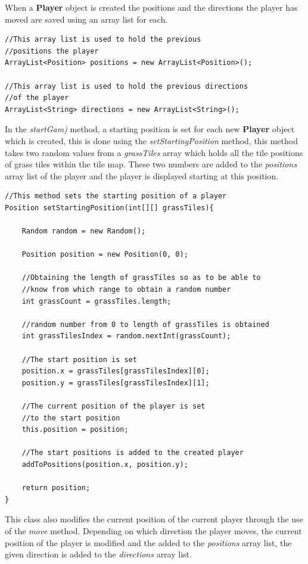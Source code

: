 \documentclass[a4paper,12pt]{extarticle}
\begin{document}
\noindent When a \textbf{Player} object is created the positions and the directions the player has moved are saved using an array list for each.

\begin{lstlisting}
//This array list is used to hold the previous 
//positions the player
ArrayList<Position> positions = new ArrayList<Position>();

//This array list is used to hold the previous directions
//of the player
ArrayList<String> directions = new ArrayList<String>();
\end{lstlisting}
\vspace{4mm}

\noindent In the \textit{startGam)} method, a starting position is set for each new \textbf{Player} object which is created, this is done using the \textit{setStartingPosition} method, this method takes two random values from a \textit{grassTiles} array which holds all the tile positions of grass tiles within the tile map. These two numbers are added to the \textit{positions} array list of the player and the player is displayed starting at this position.

\begin{lstlisting}
//This method sets the starting position of a player
Position setStartingPosition(int[][] grassTiles){

    Random random = new Random();

    Position position = new Position(0, 0);

    //Obtaining the length of grassTiles so as to be able to 
    //know from which range to obtain a random number
    int grassCount = grassTiles.length;

    //random number from 0 to length of grassTiles is obtained
    int grassTilesIndex = random.nextInt(grassCount);

    //The start position is set
    position.x = grassTiles[grassTilesIndex][0];
    position.y = grassTiles[grassTilesIndex][1];

    //The current position of the player is set 
    //to the start position
    this.position = position;

    //The start positions is added to the created player
    addToPositions(position.x, position.y);

    return position;
}
\end{lstlisting}
\vspace{4mm}

\newpage
\noindent This class also modifies the current position of the current player through the use of the \textit{move} method. Depending on which direction the player moves, the current position of the player is modified and the added to the \textit{positions} array list, the given direction is added to the \textit{directions} array list.
\end{document}
